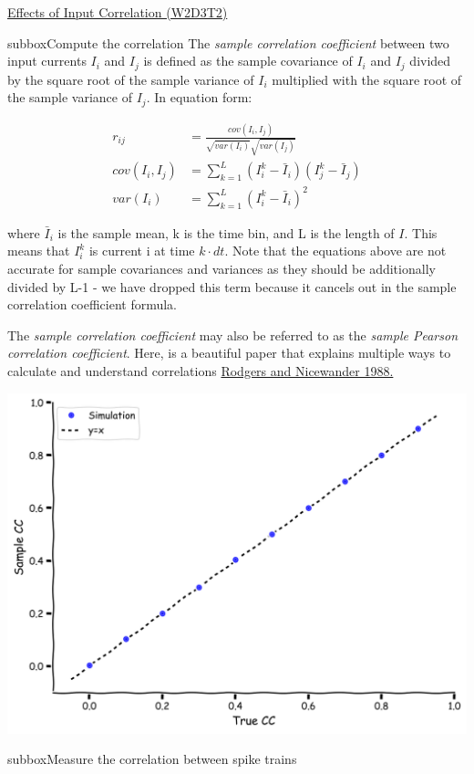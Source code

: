 \begin{textbox}{\href{https://compneuro.neuromatch.io/tutorials/W1D4_GeneralizedLinearModels/student/W1D4_Tutorial1.html}{Effects of Input Correlation (W2D3T2)} }
\begin{subbox}{subbox}{Compute the correlation}
\scriptsize
The \textit{sample correlation coefficient} between two input currents $I_i$ and $I_j$ is defined as the sample covariance of $I_i$ and $I_j$ divided by the square root of the sample variance of $I_i$ multiplied with the square root of the sample variance of $I_j$. In equation form:  

\begin{align}
r_{ij} &= \frac{cov(I_i, I_j)}{\sqrt{var(I_i)} \sqrt{var(I_j)}}\\
cov(I_i, I_j) &= \sum_{k=1}^L (I_i^k -\bar{I}_i)(I_j^k -\bar{I}_j) \\
var(I_i) &= \sum_{k=1}^L (I_i^k -\bar{I}_i)^2
\end{align}

where $\bar{I}_i$ is the sample mean, k is the time bin, and L is the length of $I$.  This means that $I_i^k$ is current i at time $k\cdot dt$. Note that the equations above are not accurate for sample covariances and variances as they should be additionally divided by L-1 - we have dropped this term because it cancels out in the sample correlation coefficient formula.

The \textit{sample correlation coefficient} may also be referred to as the \textit{sample Pearson correlation coefficient}. Here, is a beautiful paper that explains multiple ways to calculate and understand correlations \href{https://www.stat.berkeley.edu/~rabbee/correlation.pdf}{Rodgers and Nicewander 1988.}

\centering
\includegraphics[scale=0.08]{Figures/BNM/LIF_Figure5.png}
\end{subbox}
\begin{subbox}{subbox}{Measure the correlation between spike trains}
\scriptsize


\end{subbox}
\end{textbox}
